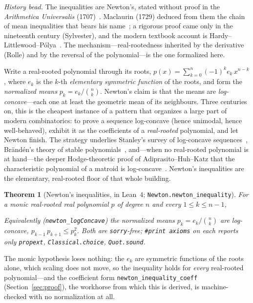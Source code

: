 \documentclass[11pt]{article}
\newtheorem{theorem}{Theorem}
\newcommand{\lean}[1]{\texttt{#1}}
\newcommand{\keyeq}[1]{\begin{center}\keybox{$\displaystyle #1$}\end{center}}
\begin{document}
\emph{History bead.} The inequalities are Newton's, stated without proof in the
\emph{Arithmetica Universalis} (1707)~\cite{Newton1707}. Maclaurin (1729) deduced from them the
chain of mean inequalities that bears his name~\cite{Maclaurin1729}; a rigorous proof came only
in the nineteenth century (Sylvester), and the modern textbook account is
Hardy--Littlewood--P\'olya~\cite{HLP}. The mechanism---real-rootedness inherited by the
derivative (Rolle) and by the reversal of the polynomial---is the one formalized here.

Write a real-rooted polynomial through its roots, $p(x)=\sum_{k=0}^{n}(-1)^k e_k\,x^{n-k}$, where
$e_k$ is the $k$-th \emph{elementary symmetric function} of the roots, and form the
\emph{normalized means} $p_k=e_k/\binom{n}{k}$. Newton's claim is that the means are
\emph{log-concave}---each one at least the geometric mean of its neighbours. Three centuries on,
this is the cheapest instance of a pattern that organizes a large part of modern combinatorics:
to prove a sequence log-concave (hence unimodal, hence well-behaved), exhibit it as the
coefficients of a \emph{real-rooted} polynomial, and let Newton finish. The strategy underlies
Stanley's survey of log-concave sequences~\cite{Stanley1989}, Br\"and\'en's theory of stable
polynomials~\cite{Branden2015}, and---when no real-rooted polynomial is at hand---the deeper
Hodge-theoretic proof of Adiprasito--Huh--Katz that the characteristic polynomial of a matroid is
log-concave~\cite{AHK2018}. Newton's inequalities are the elementary, real-rooted floor of that
whole building.

\begin{theorem}[Newton's inequalities, in Lean~4; \lean{Newton.newton\_inequality}]
\label{thm:newton}
For a \emph{monic} real-rooted real polynomial $p$ of degree $n$ and every $1\le k\le n-1$,
\keyeq{e_k^2\,\binom{n}{k-1}\binom{n}{k+1}\;\ge\;e_{k-1}\,e_{k+1}\,\binom{n}{k}^{2}.}
Equivalently (\lean{newton\_logConcave}) the normalized means $p_k=e_k/\binom{n}{k}$ are
log-concave, $p_{k-1}\,p_{k+1}\le p_k^2$. Both are \lean{sorry}-free; \lean{\#print axioms} on
each reports only \lean{propext}, \lean{Classical.choice}, \lean{Quot.sound}.
\end{theorem}

The monic hypothesis loses nothing: the $e_k$ are symmetric functions of the roots alone, which
scaling does not move, so the inequality holds for \emph{every} real-rooted polynomial---and the
coefficient form \lean{newton\_inequality\_coeff} (Section~\ref{sec:proof}), the workhorse from
which this is derived, is machine-checked with no normalization at all.
\end{document}
